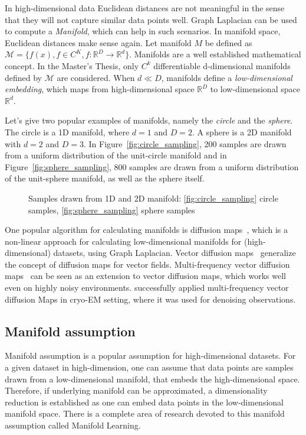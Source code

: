 In high-dimensional data Euclidean distances are not meaningful
in the sense that they will not capture similar data points well. 
Graph Laplacian can be used to compute a \textit{Manifold}, which can help in such scenarios. 
In manifold space, Euclidean distances make sense again. 
Let manifold $M$ be defined as $\mathcal{M} = \{ f(x), f \in C^K, f: \mathbb{R}^D \to \mathbb{R}^d \}$.
Manifolds are a well established mathematical concept. In the Master's Thesis, only 
$C^k$ differentiable d-dimensional manifolds defined by $\mathcal{M}$ are considered. 
When $d \ll D$, manifolds define a \textit{low-dimensional embedding}, which maps from high-dimensional space 
$\mathbb{R}^D$ to low-dimensional space $\mathbb{R}^d$.

Let's give two popular examples of manifolds, namely the \textit{circle} and the \textit{sphere}.
The circle is a 1D manifold, where $d=1$ and $D=2$. A sphere is a 2D manifold with $d=2$ and $D=3$.
In Figure~\ref{fig:circle_sampling}, 200 samples are drawn from a uniform distribution of the unit-circle manifold
and in Figure~\ref{fig:sphere_sampling}, 800 samples are drawn from a uniform distribution of the unit-sphere manifold,
as well as the sphere itself.

\begin{figure}[H]
    \hfill
    \hfill
    \hfill
        \caption{Samples drawn from 1D and 2D manifold: 
    \ref{fig:circle_sampling} circle samples,
    \ref{fig:sphere_sampling} sphere samples}
\end{figure}

One popular algorithm for calculating manifolds is diffusion maps~\cite{diffusionMaps}, 
which is a non-linear approach for calculating low-dimensional manifolds
for (high-dimensional) datasets, using Graph Laplacian.
Vector diffusion maps~\cite{vectorDiffusionMaps} generalize the concept of diffusion maps for vector fields.
Multi-frequency vector diffusion maps~\cite{multiDiffusionMaps} 
can be seen as an extension to vector diffusion maps, which works well even on highly noisy environments.
\citet{cryoEmMutliDM} successfully applied multi-frequency vector diffusion Maps in cryo-EM setting,
 where it was used for denoising observations.

\subsection{Manifold assumption}
\label{sec:manifoldAssumption}
Manifold assumption is a popular assumption for high-dimensional datasets.
For a given dataset in high-dimension, one can assume that data points are samples drawn from a low-dimensional manifold,
that embeds the high-dimensional space. 
Therefore, if underlying manifold can be approximated, a dimensionality reduction
is established as one can embed data points in the low-dimensional manifold space.
There is a complete area of research devoted to this manifold assumption called Manifold Learning\cite{ManifoldLearning}.

